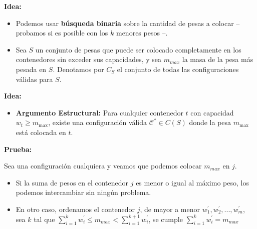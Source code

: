 \documentclass[12pt]{beamer}
\begin{document}
\begin{frame}
\begin{bloque}[\textcolor{black}{POI 2007 Weights} (\href{https://szkopul.edu.pl/problemset/problem/h_QPStxSmfEHuL2h_I5Qpa29/site/?key=statement}{szkopul})]

\textbf{Idea:} 

\begin{itemize}
    \item Podemos usar \textbf{búsqueda binaria} sobre la cantidad de pesas a colocar -- probamos si es posible con los $k$ menores pesos --.
    \pause
    \item Sea $S$ un conjunto de pesas que puede ser colocado completamente en los contenedores sin exceder sus capacidades, y sea $m_{max}$ la masa de la pesa más pesada en $S$. Denotamos por $C_S$ el conjunto de todas las configuraciones válidas para $S$.
\end{itemize}
\end{bloque}
\end{frame}

\begin{frame}
\begin{bloque}[\textcolor{black}{POI 2007 Weights} (\href{https://szkopul.edu.pl/problemset/problem/h_QPStxSmfEHuL2h_I5Qpa29/site/?key=statement}{szkopul})]

\textbf{Idea:} 

\begin{itemize}
    \item \textbf{Argumento Estructural:} 
    Para cualquier contenedor $t$ con capacidad $w_t \geq m_{\max}$, existe una configuración válida $\mathcal{C}^* \in C(S)$ donde la pesa $m_{\max}$ está colocada en $t$.
\end{itemize}
\end{bloque}
\end{frame}

\begin{frame}
\begin{bloque}[\textcolor{black}{POI 2007 Weights} (\href{https://szkopul.edu.pl/problemset/problem/h_QPStxSmfEHuL2h_I5Qpa29/site/?key=statement}{szkopul})]

\textbf{Prueba:} 

Sea una configuración cualquiera y veamos que podemos colocar $m_{max}$ en $j$.   

\begin{itemize}
    \item Si la suma de pesos en el contenedor $j$ es menor o igual al máximo peso, los podemos intercambiar sin ningún problema. 
    \pause
    \item En otro caso, ordenamos el contenedor $j$, de mayor a menor $w^{'}_1, w^{'}_2, ..., w^{'}_m$, sea $k$ tal que \(\sum\limits_{i=1}^k w^{'}_i \le m_{max} < \sum\limits_{i=1}^{k+1} w^{'}_i\), se cumple $\sum\limits_{i=1}^k w^{'}_i = m_{max}$ 
\end{itemize}
\end{bloque}

\end{frame}
\end{document}
